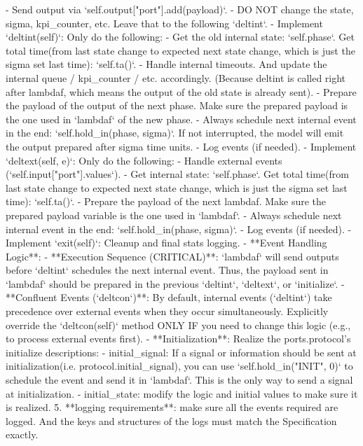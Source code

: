 \begin{promptbox}
        - Send output via `self.output["port"].add(payload)`.
        - DO NOT change the state, sigma, kpi_counter, etc. Leave that to the following `deltint`.
    - Implement `deltint(self)`: Only do the following:
        - Get the old internal state: `self.phase`. Get total time(from last state change to expected next state change, which is just the sigma set last time): `self.ta()`.
        - Handle internal timeouts. And update the internal queue / kpi_counter / etc. accordingly. (Because deltint is called right after lambdaf, which means the output of the old state is already sent). 
        - Prepare the payload of the output of the next phase. Make sure the prepared payload is the one used in `lambdaf` of the new phase.
        - Always schedule next internal event in the end: `self.hold_in(phase, sigma)`. If not interrupted, the model will emit the output prepared after sigma time units. 
        - Log events (if needed). 
    - Implement `deltext(self, e)`: Only do the following:
        - Handle external events (`self.input["port"].values`).
        - Get internal state: `self.phase`. Get total time(from last state change to expected next state change, which is just the sigma set last time): `self.ta()`.
        - Prepare the payload of the next lambdaf. Make sure the prepared payload variable is the one used in `lambdaf`.
        - Always schedule next internal event in the end: `self.hold_in(phase, sigma)`.
        - Log events (if needed). 
    - Implement `exit(self)`: Cleanup and final stats logging.
    - **Event Handling Logic**:
        - **Execution Sequence (CRITICAL)**: `lambdaf` will send outputs before `deltint` schedules the next internal event. Thus, the payload sent in `lambdaf` should be prepared in the previous `deltint`, `deltext`, or `initialize`. 
        - **Confluent Events (`deltcon`)**: By default, internal events (`deltint`) take precedence over external events when they occur simultaneously. Explicitly override the `deltcon(self)` method ONLY IF you need to change this logic (e.g., to process external events first).
        - **Initialization**: Realize the ports.protocol's initialize descriptions: 
            - initial_signal: If a signal or information should be sent at initialization(i.e. protocol.initial_signal), you can use `self.hold_in("INIT", 0)` to schedule the event and send it in `lambdaf`. This is the only way to send a signal at initialization.
            - initial_state: modify the logic and initial values to make sure it is realized. 
5. **logging requirements**: make sure all the events required are logged. And the keys and structures of the logs must match the Specification exactly. 
\end{promptbox}

